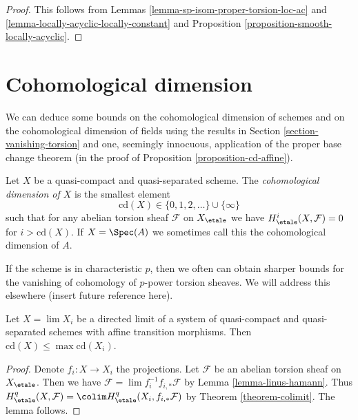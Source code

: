 \begin{proof}
This follows from Lemmas \ref{lemma-sp-isom-proper-torsion-loc-ac}
and \ref{lemma-locally-acyclic-locally-constant} and
Proposition \ref{proposition-smooth-locally-acyclic}.
\end{proof}

















\section{Cohomological dimension}
\label{section-cd}

\noindent
We can deduce some bounds on the cohomological dimension of
schemes and on the cohomological dimension of fields using
the results in Section \ref{section-vanishing-torsion}
and one, seemingly innocuous, application of the proper base
change theorem (in the proof of Proposition \ref{proposition-cd-affine}).

\begin{definition}
\label{definition-cd}
Let $X$ be a quasi-compact and quasi-separated scheme.
The {\it cohomological dimension of $X$} is the smallest
element
$$
\text{cd}(X) \in \{0, 1, 2, \ldots\} \cup \{\infty\}
$$
such that for any abelian torsion sheaf $\mathcal{F}$
on $X_\etale$ we have $H^i_\etale(X, \mathcal{F}) = 0$
for $i > \text{cd}(X)$. If $X = \Spec(A)$ we sometimes
call this the cohomological dimension of $A$.
\end{definition}

\noindent
If the scheme is in characteristic $p$, then we often can
obtain sharper bounds for the vanishing of cohomology of
$p$-power torsion sheaves. We will address this elsewhere
(insert future reference here).

\begin{lemma}
\label{lemma-cd-limit}
Let $X = \lim X_i$ be a directed limit of a system of
quasi-compact and quasi-separated schemes with affine
transition morphisms. Then $\text{cd}(X) \leq \max \text{cd}(X_i)$.
\end{lemma}

\begin{proof}
Denote $f_i : X \to X_i$ the projections.
Let $\mathcal{F}$ be an abelian torsion sheaf on $X_\etale$.
Then we have $\mathcal{F} = \lim f_i^{-1}f_{i, *}\mathcal{F}$
by Lemma \ref{lemma-linus-hamann}.
Thus $H^q_\etale(X, \mathcal{F}) =
\colim H^q_\etale(X_i, f_{i, *}\mathcal{F})$
by Theorem \ref{theorem-colimit}.
The lemma follows.
\end{proof}

